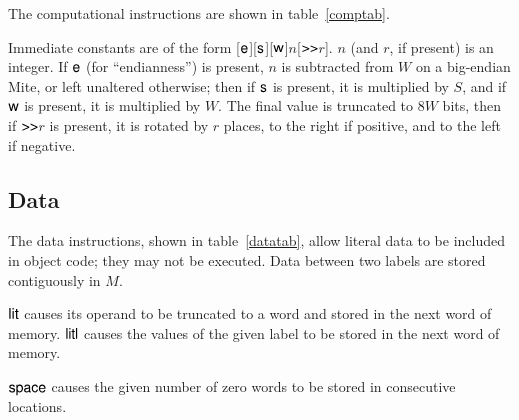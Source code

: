 \documentclass[english]{scrartcl}
\newcommand{\synfont}{\sffamily}
\newcommand{\syn}[1]{\ensuremath{\text{\synfont #1}}}
\newcommand{\insttab}[2]{\ctable[caption=#1]{>{\synfont}p{13ex}p{44ex}}{}{\FL #2\bottomrule}}
\begin{document}
\insttab{Computational instructions\label{comptab}}{}

The computational instructions are shown in table~\ref{comptab}.

Immediate constants are of the form
[\syn{e}][\syn{s}][\syn{w}]$n$[\syn{>\/>}$r$]. $n$ (and $r$, if
present) is an integer. If \syn{e} (for ``endianness'') is present,
$n$ is subtracted from $W$ on a big-endian Mite, or left unaltered
otherwise; then if \syn{s} is present, it is multiplied by $S$, and if
\syn{w} is present, it is multiplied by $W$. The final value is
truncated to $8W$ bits, then if \syn{>\/>}$r$ is present, it is
rotated by $r$ places, to the right if positive, and to the left if
negative.


\subsection{Data}

The data instructions, shown in table~\ref{datatab}, allow literal
data to be included in object code; they may not be executed. Data
between two labels are stored contiguously in $M$.

\insttab{Data instructions\label{datatab}}{}

\syn{lit} causes its operand to be truncated to a word and stored in
the next word of memory. \syn{litl} causes the values of the given
label to be stored in the next word of memory.

\syn{space} causes the given number of zero words to be stored in
consecutive locations.







\end{document}
